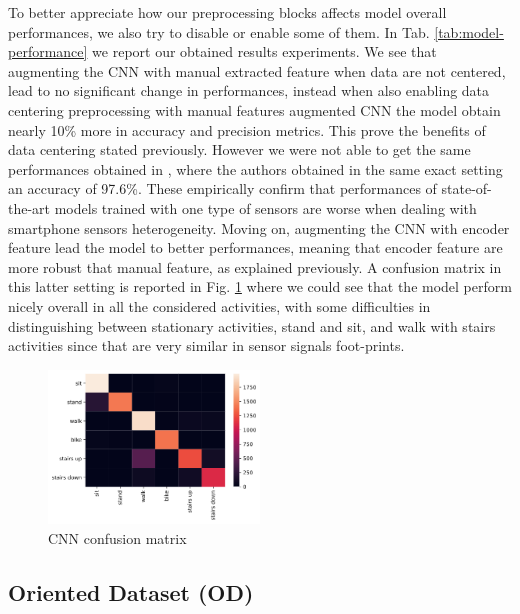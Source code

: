 To better appreciate how our preprocessing blocks affects model overall performances, we also try to disable or enable some of them. In Tab. \ref{tab:model-performance} we report our obtained results experiments. We see that augmenting the CNN with manual extracted feature when data are not centered, lead to no significant change in performances, instead when also enabling data centering preprocessing with manual features augmented CNN the model obtain nearly 10\% more in accuracy and precision metrics. This prove the benefits of data centering stated previously. However we were not able to get the same performances obtained in \cite{ignatov2018real}, where the authors obtained in the same exact setting an accuracy of 97.6\%. These empirically confirm that performances of state-of-the-art models trained with one type of sensors are worse when dealing with smartphone sensors heterogeneity. Moving on, augmenting the CNN with encoder feature lead the model to better performances, meaning that encoder feature are more robust that manual feature, as explained previously. A confusion matrix in this latter setting is reported in Fig. \ref{fig:cnn-confusion-matrix} where we could see that the model perform nicely overall in all the considered activities, with some difficulties in distinguishing between stationary activities, stand and sit, and walk with stairs activities since that are very similar in sensor signals foot-prints.

\begin{figure}[h]
	\centering
	\includegraphics[width=0.5\textwidth]{images/confusion_matrix.png}
	\caption{CNN confusion matrix}
	\label{fig:cnn-confusion-matrix}
\end{figure}


\subsection{Oriented Dataset (OD)}


